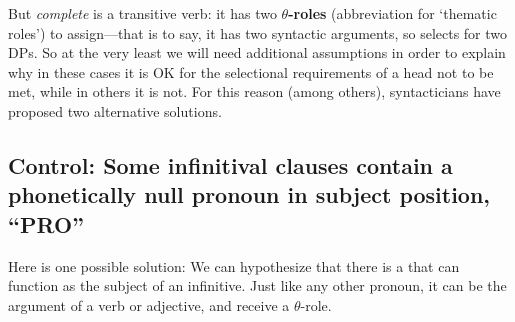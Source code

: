 \documentclass{article}
\begin{document}
But \emph{complete} is a transitive verb: it has two \textbf{$\theta$-roles} (abbreviation for `thematic roles') to assign---that is to say, it has two syntactic arguments, so selects for two DPs.
So at the very least we will need additional assumptions in order to explain why in these cases it is OK for the selectional requirements of a head not to be met, while in others it is not.
For this reason (among others), syntacticians have proposed two alternative solutions.

\subsection{Control: Some infinitival clauses contain a phonetically null pronoun in subject position, ``\textsc{PRO}''}

Here is one possible solution: We can hypothesize that there is a  that can function as the subject of an infinitive.
Just like any other pronoun, it can be the argument of a verb or adjective, and receive a $\theta$-role.  
\end{document}
